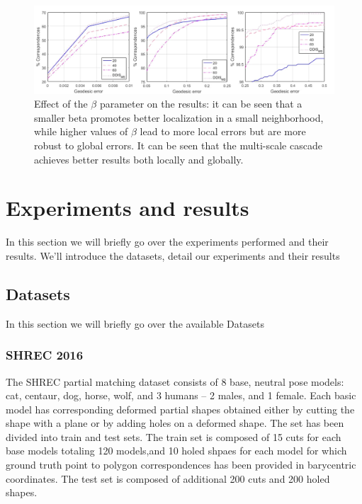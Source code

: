 \documentclass[10pt,twocolumn,letterpaper]{article}
\begin{document}
\begin{figure}
	\centering
	\includegraphics[width=1\textwidth]{figures/AblationStudyThreshold.png}
	\caption{Effect of the $\beta$ parameter on the results: it can be seen that a smaller beta promotes better localization in a small neighborhood, while higher values of $\beta$ lead to more local errors but are more robust to global errors. It can be seen that the multi-scale cascade achieves better results both locally and globally.}
\end{figure}
\section{Experiments and results}\label{section:results}

In this section we will briefly go over the experiments performed and their results. We'll introduce the datasets, detail our experiments and their results
\subsection{Datasets}
In this section we will briefly go over the available Datasets
\subsubsection{SHREC 2016}  
The SHREC partial matching dataset consists of 8 base, neutral pose models: cat, centaur, dog, horse, wolf, and 3 humans – 2 males, and 1 female. Each basic model has corresponding deformed partial shapes obtained either by cutting the shape with a plane or by adding holes on a deformed shape. The set has been divided into train and test sets. The train set is composed of 15 cuts for each base models totaling 120 models,and 10 holed shpaes for each model for which ground truth point to polygon correspondences has been provided in barycentric coordinates. The test set is composed of additional 200 cuts and 200 holed shapes.
\end{document}
